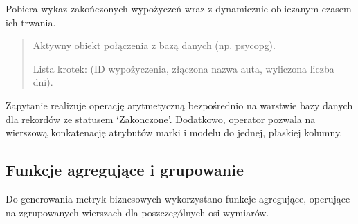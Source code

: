 \documentclass[a4paper,11pt,english,openany,oneside]{sphinxmanual}
\begin{document}
\begin{savenotes}\begin{fulllineitems}

\pysigstartsignatures
\pysiglinewithargsret
{}
{}
{}
\pysigstopsignatures
\sphinxAtStartPar
Pobiera wykaz zakończonych wypożyczeń wraz z dynamicznie obliczanym czasem ich trwania.
\begin{quote}\begin{description}
\sphinxAtStartPar
{} \textendash{} Aktywny obiekt połączenia z bazą danych (np. psycopg).

\sphinxAtStartPar
Lista krotek: (ID wypożyczenia, złączona nazwa auta, wyliczona liczba dni).

\end{description}\end{quote}

\sphinxAtStartPar
{} Zapytanie realizuje operację arytmetyczną  bezpośrednio na warstwie bazy danych dla rekordów ze statusem ‘Zakonczone’. Dodatkowo, operator \sphinxcode{\sphinxupquote{||}} pozwala na wierszową konkatenację atrybutów marki i modelu do jednej, płaskiej kolumny.

\end{fulllineitems}\end{savenotes}



\subsection{Funkcje agregujące i grupowanie}
\label{\detokenize{rozdzial_5/index:funkcje-agregujace-i-grupowanie}}
\sphinxAtStartPar
Do generowania metryk biznesowych wykorzystano funkcje agregujące, operujące na zgrupowanych wierszach dla poszczególnych osi wymiarów.
\end{document}
